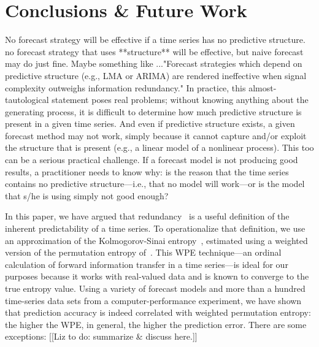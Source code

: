 \section{ Conclusions \& Future Work }\label{sec:conc}

No forecast strategy will be effective if a time series has no
predictive structure.{\color{red} no forecast strategy that uses **structure** will be effective, but naive forecast may do just fine. Maybe something like ..."Forecast strategies which depend on predictive structure (e.g., LMA or ARIMA) are rendered ineffective when signal complexity outweighs information redundancy."}  In practice, this almost-tautological statement
poses real problems; without knowing anything about the generating
process, it is difficult to determine how much predictive structure is
present in a given time series.  And even if predictive structure
exists, a given forecast method may not work, simply because it cannot
capture and/or exploit the structure that is present (e.g., a linear
model of a nonlinear process).  This too can be a serious practical
challenge.  If a forecast model is not producing good results, a
practitioner needs to know why: is the reason that the time series
contains no predictive structure---i.e., that no model will work---or
is the model that s/he is using simply not good enough?

In this paper, we have argued that redundancy~\cite{crutchfield2003}
is a useful definition of the inherent predictability of a time
series.  To operationalize that definition, we use an approximation of
the Kolmogorov-Sinai entropy~\cite{lind95}, estimated using a weighted
version of the permutation entropy of~\cite{bandt2002per}.  This WPE
technique---an ordinal calculation of forward information transfer in
a time series---is ideal for our purposes because it works with
real-valued data and is known to converge to the true entropy value.
Using a variety of forecast models and more than a hundred time-series
data sets from a computer-performance experiment, we have shown that
prediction accuracy is indeed correlated with weighted permutation
entropy: the higher the WPE, in general, the higher the prediction
error.  There are some exceptions: [[Liz to do: summarize \& discuss
    here.]]


